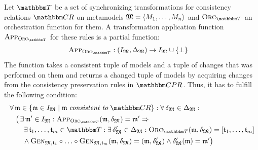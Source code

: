 \begin{definition} \label{def:applicationfunction}
    Let $\transformationset{T}$ be a set of synchronizing transformations for consistency relations $\consistencyrelationset{CR}$ on metamodels $\mathfrak{M} = \langle M_{1}, \dots, M_{n} \rangle$ and $\orcfunction{\transformationset{T}}$ an orchestration function for them.
    A transformation application function $\appfunction{\orcfunction{\transformationset{T}}}$ for these rules is a partial function:
    \begin{align*}
        &
        \appfunction{\orcfunction{\transformationset{T}}} : (\metamodeltupleinstanceset{M}, \changeuniverse{\metamodeltuple{M}}) \rightarrow \metamodeltupleinstanceset{M} \cup \setted{\bot}
    \end{align*}
    The function takes a consistent tuple of models and a tuple of changes that was performed on them and returns a changed tuple of models by acquiring changes from the consistency preservation rules in $\consistencypreservationruleset{}$. %
    Thus, it has to fulfill the following condition:
    \begin{align*}
        &
        \forall \modeltuple{m} \in \setted{\modeltuple{m} \in  \metamodeltupleinstanceset{M} \mid \modeltuple{m} \consistenttomath \consistencyrelationset{CR}} : \forall \changetuple{\metamodeltuple{M}} \in \changeuniverse{\metamodeltuple{M}} : \\
        & \formulaskip
        \big( 
            \exists \modeltuple{m'} \in \metamodeltupleinstanceset{M} : 
            \appfunction{\orcfunction{\transformationset{T}}}(\modeltuple{m}, \changetuple{\metamodeltuple{M}}) = \modeltuple{m'} \Rightarrow\\
            & \formulaskip \formulaskip
            \exists \transformation{t}_{1}, \dots, \transformation{t}_{m} \in \transformationset{T} :
            \exists \changetuple{\metamodeltuple{M}}' \in \changeuniverse{\metamodeltuple{M}} : %
            \orcfunction{\transformationset{T}}(\modeltuple{m}, \changetuple{\metamodeltuple{M}}) = \sequenced{\transformation{t}_{1}, \dots, \transformation{t}_{m}} \\
            & \formulaskip \formulaskip
            \land \generalizationfunction{\metamodeltuple{M},\transformation{t}_{1}} \concatfunction \dots \concatfunction \generalizationfunction{\metamodeltuple{M},\transformation{t}_{m}}(\modeltuple{m}, \changetuple{\metamodeltuple{M}}) = (\modeltuple{m}, \changetuple{\metamodeltuple{M}}') %
            \land \changetuple{\metamodeltuple{M}}'(\modeltuple{m}) = \modeltuple{m'}
        \big)
    \end{align*}
\end{definition}

